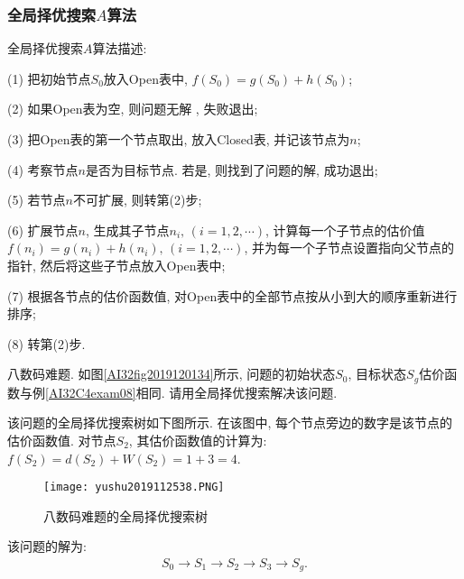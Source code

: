 \subsubsection{全局择优搜索$A$算法}
全局择优搜索$A$算法描述:

\quad   (1) 把初始节点$S_0$放入Open表中, $f(S_0)=g(S_0)+h(S_0)$;

\quad   (2) 如果Open表为空, 则问题无解 , 失败退出;

\quad   (3) 把Open表的第一个节点取出, 放入Closed表, 并记该节点为$n$;

\quad   (4) 考察节点$n$是否为目标节点. 若是, 则找到了问题的解, 成功退出;

\quad   (5) 若节点$n$不可扩展, 则转第(2)步;

\quad   (6) 扩展节点$n$, 生成其子节点$n_i,\,(i=1, 2,\cdots)$, 计算每一个子节点的估价值$f(n_i)=g(n_i)+h(n_i),\,(i=1, 2, \cdots)$, 并为每一个子节点设置指向父节点的指针, 然后将这些子节点放入Open表中;

\quad   (7) 根据各节点的估价函数值, 对Open表中的全部节点按从小到大的顺序重新进行排序;

\quad   (8) 转第(2)步.
\begin{example}
    八数码难题. 如图\ref{AI32fig2019120134}所示, 问题的初始状态$S_0$, 目标状态$S_g$估价函数与例\ref{AI32C4exam08}相同. 请用全局择优搜索解决该问题.
\end{example}
\begin{result}
    该问题的全局择优搜索树如下图所示. 在该图中, 每个节点旁边的数字是该节点的估价函数值.
    对节点$S_2$, 其估价函数值的计算为: $f(S_2)=d(S_2)+W(S_2) =1+3=4$.
\begin{figure}[H]
    \centering
    \texttt{[image: yushu2019112538.PNG]}
    \caption{八数码难题的全局择优搜索树}
    \label{AI32fig38}
\end{figure}
该问题的解为:
\begin{align}
    S_0\rightarrow S_1\rightarrow S_2\rightarrow S_3\rightarrow S_g.
\end{align}
\end{result}
